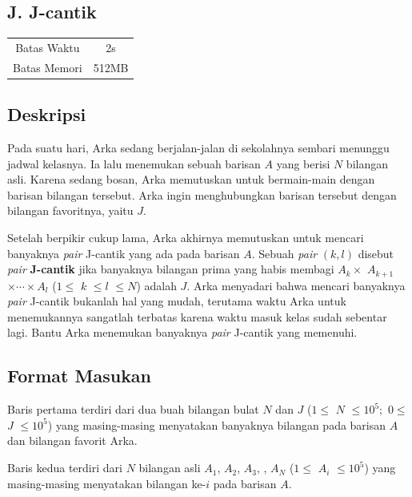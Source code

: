 \documentclass{article}
\begin{document}
\begin{center}
    \section*{J. J-cantik} %

    \begin{tabular}{ | c c | }
        \hline
        Batas Waktu  & 2s \\    %
        Batas Memori & 512MB \\  %
        \hline
    \end{tabular}
\end{center}

\subsection*{Deskripsi}
Pada suatu hari, Arka sedang berjalan-jalan di sekolahnya sembari menunggu jadwal kelasnya. Ia lalu menemukan sebuah barisan $A$ yang berisi $N$ bilangan asli. Karena sedang bosan, Arka memutuskan untuk bermain-main dengan barisan bilangan tersebut. Arka ingin menghubungkan barisan tersebut dengan bilangan favoritnya, yaitu $J$. 

Setelah berpikir cukup lama, Arka akhirnya memutuskan untuk mencari banyaknya \textit{pair} J-cantik yang ada pada barisan $A$. Sebuah \textit{pair} $(k,l)$ disebut \textit{pair} \textbf{J-cantik} jika banyaknya bilangan prima yang habis membagi $A_k \times$ $A_{k+1}$ $\times \cdots \times A_l$ ($1 \leq$ $k$ $\leq  l$  $\leq  N$) adalah $J$. Arka menyadari bahwa mencari banyaknya \textit{pair} J-cantik bukanlah hal yang mudah, terutama waktu Arka untuk menemukannya sangatlah terbatas karena waktu masuk kelas sudah sebentar lagi. Bantu Arka menemukan banyaknya \textit{pair} J-cantik yang memenuhi.

\subsection*{Format Masukan}
Baris pertama terdiri dari dua buah bilangan bulat $N$ dan $J$ ($1 \leq$ $N$ $\leq 10^5;$ $0 \leq$ $J$ $\leq 10^5$) yang masing-masing menyatakan banyaknya bilangan pada barisan $A$ dan bilangan favorit Arka.

Baris kedua terdiri dari $N$ bilangan asli $A_1$, $A_2$, $A_3$, \cdots, $A_N$ ($1 \leq$ $A_i$ $ \leq 10^5$) yang masing-masing menyatakan bilangan ke-$i$ pada barisan $A$.
\end{document}
